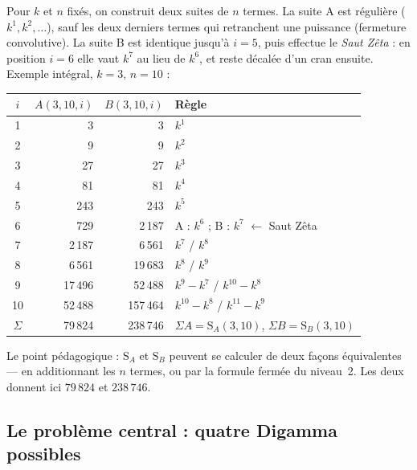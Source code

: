 \documentclass[11pt,a4paper]{article}
\newcommand{\SA}{\mathrm{S}_A}
\newcommand{\SB}{\mathrm{S}_B}
\begin{document}
Pour $k$ et $n$ fixés, on construit deux suites de $n$ termes. La suite A
est régulière ($k^1, k^2, \dots$), sauf les deux derniers termes qui
retranchent une puissance (fermeture convolutive). La suite B est identique
jusqu'à $i = 5$, puis effectue le \emph{Saut Zêta} : en position
$i = 6$ elle vaut $k^7$ au lieu de $k^6$, et reste décalée d'un cran
ensuite. Exemple intégral, $k = 3$, $n = 10$ :
\begin{center}\small
\begin{tabular}{@{}c r r l@{}}
\toprule
\rowcolor{spectralgris}
$i$ & $A(3,10,i)$ & $B(3,10,i)$ & Règle \\
\midrule
1 & 3 & 3 & $k^1$ \\
2 & 9 & 9 & $k^2$ \\
3 & 27 & 27 & $k^3$ \\
4 & 81 & 81 & $k^4$ \\
5 & 243 & 243 & $k^5$ \\
6 & 729 & 2\,187 & A : $k^6$ ; B : $k^7$ $\leftarrow$ Saut Zêta \\
7 & 2\,187 & 6\,561 & $k^7$ / $k^8$ \\
8 & 6\,561 & 19\,683 & $k^8$ / $k^9$ \\
9 & 17\,496 & 52\,488 & $k^9-k^7$ / $k^{10}-k^8$ \\
10 & 52\,488 & 157\,464 & $k^{10}-k^8$ / $k^{11}-k^9$ \\
\midrule
$\Sigma$ & 79\,824 & 238\,746 & $\Sigma A = \SA(3,10)$, $\Sigma B = \SB(3,10)$ \\
\bottomrule
\end{tabular}
\end{center}
Le point pédagogique : $\SA$ et $\SB$ peuvent se calculer de deux façons
équivalentes --- en additionnant les $n$ termes, ou par la formule fermée
du niveau~2. Les deux donnent ici $79\,824$ et $238\,746$.

\subsection{Le problème central : quatre Digamma possibles}
\end{document}
